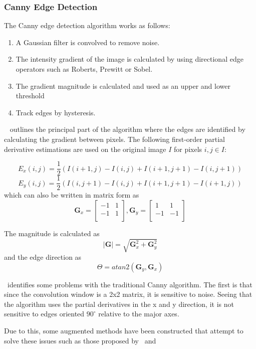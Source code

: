 \documentclass[a4paper, 12pt]{report}
\begin{document}
\subsubsection{Canny Edge Detection}
The Canny edge detection algorithm works as follows:
\begin{enumerate}
    \item A Gaussian filter is convolved to remove noise.
    \item The intensity gradient of the image is calculated by using directional edge operators such as Roberts, Prewitt or Sobel.
    \item The gradient magnitude is calculated and used as an upper and lower threshold
    \item Track edges by hysteresis.
\end{enumerate}

~\cite{rong2014improved} outlines the principal part of the algorithm where the edges are identified by calculating the gradient between pixels. The following first-order partial derivative estimations are used on the original image \(I\) for pixels \(i,j \in I\):

\[E_x(i,j)=\frac{1}{2}(I(i+1,j)-I(i,j)+I(i+1,j+1)-I(i,j+1))\]
\[E_y(i,j)=\frac{1}{2}(I(i,j+1)-I(i,j)+I(i+1,j+1)-I(i+1,j))\]
which can also be written in matrix form as
\[\mathbf{G}_x=\begin{bmatrix}
        -1 & 1 \\
        -1 & 1 \\
    \end{bmatrix},
    \mathbf{G}_y=\begin{bmatrix}
        1  & 1  \\
        -1 & -1 \\
    \end{bmatrix}
\]

The magnitude is calculated as
\[|\mathbf{G}|=\sqrt{\mathbf{G}_x^2+\mathbf{G}_y^2}\]
and the edge direction as
\[\Theta=atan2(\mathbf{G}_y,\mathbf{G}_x)\]

~\cite{rong2014improved}identifies some problems with the traditional Canny algorithm. The first is that since the convolution window is a 2x2 matrix, it is sensitive to noise. Seeing that the algorithm uses the partial derivatives in the x and y direction, it is not sensitive to edges oriented $90^{\circ}$ relative to the major axes.\par

Due to this, some augmented methods have been constructed that attempt to solve these issues such as those proposed by~\cite{rong2014improved} and~\cite{xuan2017improved}
\end{document}
